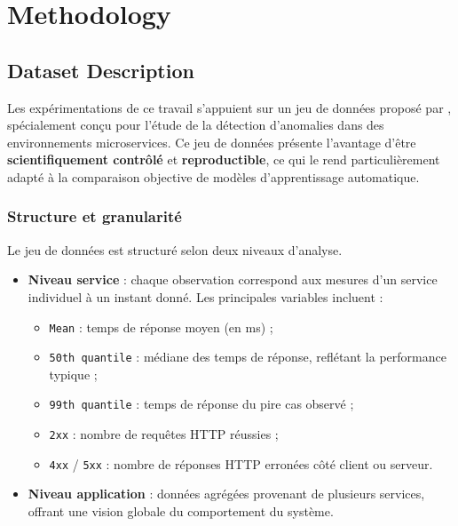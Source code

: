 \documentclass[conference]{IEEEtran}
\begin{document}
\section{Methodology}
\subsection{Dataset Description}

Les expérimentations de ce travail s'appuient sur un jeu de données proposé par \cite{nobre2023}, spécialement conçu pour l’étude de la détection d’anomalies dans des environnements microservices. Ce jeu de données présente l’avantage d’être \textbf{scientifiquement contrôlé} et \textbf{reproductible}, ce qui le rend particulièrement adapté à la comparaison objective de modèles d’apprentissage automatique.

\subsubsection{Structure et granularité}
Le jeu de données est structuré selon deux niveaux d’analyse.
\begin{itemize}
    \item \textbf{Niveau service} : chaque observation correspond aux mesures d’un service individuel à un instant donné. Les principales variables incluent :
    \begin{itemize}
        \item \texttt{Mean} : temps de réponse moyen (en ms) ;
        \item \texttt{50th quantile} : médiane des temps de réponse, reflétant la performance typique ;
        \item \texttt{99th quantile} : temps de réponse du pire cas observé ;
        \item \texttt{2xx} : nombre de requêtes HTTP réussies ;
        \item \texttt{4xx} / \texttt{5xx} : nombre de réponses HTTP erronées côté client ou serveur.
    \end{itemize}
    \item \textbf{Niveau application} : données agrégées provenant de plusieurs services, offrant une vision globale du comportement du système.
\end{itemize}
\end{document}
